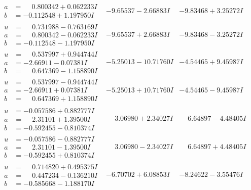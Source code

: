 \documentclass[1p]{elsarticle_modified}
\theoremstyle{definition}
\begin{document}
$$\begin{array}{c|c|c}
\begin{aligned}
a &= \phantom{-}0.800342 + 0.062233 I \\
b &= -0.112548 + 1.197950 I\end{aligned}
 & -9.65537 - 2.66883 I & -9.83468 + 3.25272 I \\ \hline\begin{aligned}
u &= \phantom{-}0.731988 - 0.763169 I \\
a &= \phantom{-}0.800342 - 0.062233 I \\
b &= -0.112548 - 1.197950 I\end{aligned}
 & -9.65537 + 2.66883 I & -9.83468 - 3.25272 I \\ \hline\begin{aligned}
u &= \phantom{-}0.537997 + 0.944744 I \\
a &= -2.66911 - 0.07381 I \\
b &= \phantom{-}0.647369 - 1.158890 I\end{aligned}
 & -5.25013 - 10.71760 I & -4.54465 + 9.45987 I \\ \hline\begin{aligned}
u &= \phantom{-}0.537997 - 0.944744 I \\
a &= -2.66911 + 0.07381 I \\
b &= \phantom{-}0.647369 + 1.158890 I\end{aligned}
 & -5.25013 + 10.71760 I & -4.54465 - 9.45987 I \\ \hline\begin{aligned}
u &= -0.057586 + 0.882777 I \\
a &= \phantom{-}2.31101 + 1.39500 I \\
b &= -0.592455 - 0.810374 I\end{aligned}
 & \phantom{-}3.06980 + 2.34027 I & \phantom{-}6.64897 - 4.48405 I \\ \hline\begin{aligned}
u &= -0.057586 - 0.882777 I \\
a &= \phantom{-}2.31101 - 1.39500 I \\
b &= -0.592455 + 0.810374 I\end{aligned}
 & \phantom{-}3.06980 - 2.34027 I & \phantom{-}6.64897 + 4.48405 I \\ \hline\begin{aligned}
u &= \phantom{-}0.714820 + 0.495375 I \\
a &= \phantom{-}0.447234 - 0.136210 I \\
b &= -0.585668 - 1.188170 I\end{aligned}
 & -6.70702 + 6.08853 I & -8.24622 - 3.55476 I \\ \hline\begin{aligned}

\end{aligned}
\end{array}$$
\end{document}
